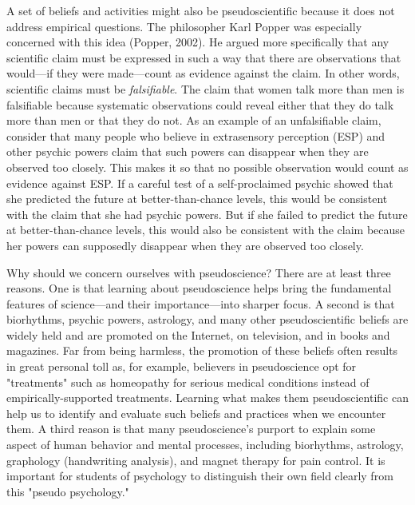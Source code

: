 A set of beliefs and activities might also be pseudoscientific because it does not address empirical questions. The philosopher Karl Popper was especially concerned with this idea (Popper, 2002). He argued more specifically that any scientific claim must be expressed in such a way that there are observations that would---if they were made---count as evidence against the claim. In other words, scientific claims must be \emph{falsifiable}. The claim that women talk more than men is falsifiable because systematic observations could reveal either that they do talk more than men or that they do not. As an example of an unfalsifiable claim, consider that many people who believe in extrasensory perception (ESP) and other psychic powers claim that such powers can disappear when they are observed too closely. This makes it so that no possible observation would count as evidence against ESP. If a careful test of a self-proclaimed psychic showed that she predicted the future at better-than-chance levels, this would be consistent with the claim that she had psychic powers. But if she failed to predict the future at better-than-chance levels, this would also be consistent with the claim because her powers can supposedly disappear when they are observed too closely.

Why should we concern ourselves with pseudoscience? There are at least three reasons. One is that learning about pseudoscience helps bring the fundamental features of science---and their importance---into sharper focus. A second is that biorhythms, psychic powers, astrology, and many other pseudoscientific beliefs are widely held and are promoted on the Internet, on television, and in books and magazines. Far from being harmless, the promotion of these beliefs often results in great personal toll as, for example, believers in pseudoscience opt for "treatments" such as homeopathy for serious medical conditions instead of empirically-supported treatments. Learning what makes them pseudoscientific can help us to identify and evaluate such beliefs and practices when we encounter them. A third reason is that many pseudoscience's purport to explain some aspect of human behavior and mental processes, including biorhythms, astrology, graphology (handwriting analysis), and magnet therapy for pain control. It is important for students of psychology to distinguish their own field clearly from this "pseudo psychology."

